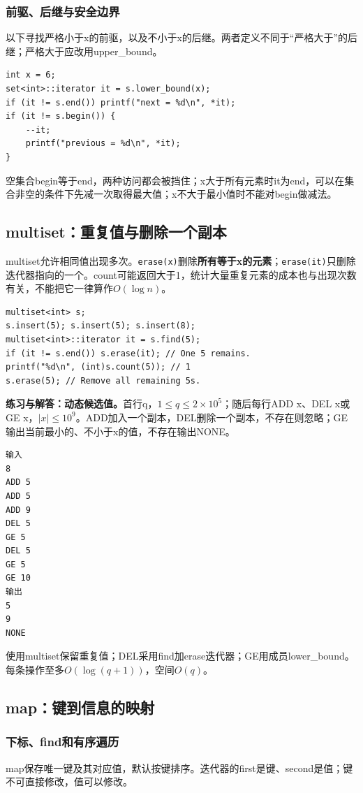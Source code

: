 \subsubsection{前驱、后继与安全边界}
以下寻找严格小于x的前驱，以及不小于x的后继。两者定义不同于“严格大于”的后继；严格大于应改用upper\_bound。
\begin{lstlisting}
int x = 6;
set<int>::iterator it = s.lower_bound(x);
if (it != s.end()) printf("next = %d\n", *it);
if (it != s.begin()) {
    --it;
    printf("previous = %d\n", *it);
}
\end{lstlisting}
空集合begin等于end，两种访问都会被挡住；x大于所有元素时it为end，可以在集合非空的条件下先减一次取得最大值；x不大于最小值时不能对begin做减法。

\subsection{multiset：重复值与删除一个副本}
multiset允许相同值出现多次。\texttt{erase(x)}删除\textbf{所有等于x的元素}；\texttt{erase(it)}只删除迭代器指向的一个。count可能返回大于1，统计大量重复元素的成本也与出现次数有关，不能把它一律算作$O(\log n)$。
\begin{lstlisting}
multiset<int> s;
s.insert(5); s.insert(5); s.insert(8);
multiset<int>::iterator it = s.find(5);
if (it != s.end()) s.erase(it); // One 5 remains.
printf("%d\n", (int)s.count(5)); // 1
s.erase(5); // Remove all remaining 5s.
\end{lstlisting}
\textbf{练习与解答：动态候选值。}首行q，$1\le q\le2\times10^5$；随后每行ADD x、DEL x或GE x，$|x|\le10^9$。ADD加入一个副本，DEL删除一个副本，不存在则忽略；GE输出当前最小的、不小于x的值，不存在输出NONE。
\begin{verbatim}
输入
8
ADD 5
ADD 5
ADD 9
DEL 5
GE 5
DEL 5
GE 5
GE 10
输出
5
9
NONE
\end{verbatim}
使用multiset保留重复值；DEL采用find加erase迭代器；GE用成员lower\_bound。每条操作至多$O(\log(q+1))$，空间$O(q)$。

\subsection{map：键到信息的映射}
\subsubsection{下标、find和有序遍历}
map保存唯一键及其对应值，默认按键排序。迭代器的first是键、second是值；键不可直接修改，值可以修改。

